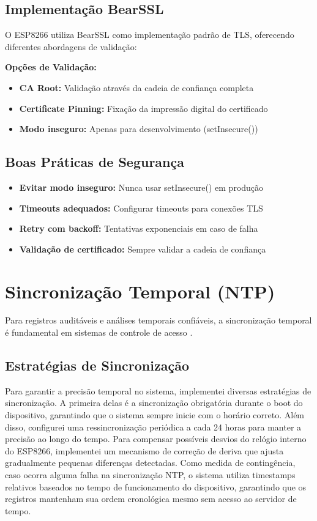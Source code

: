 \subsection{Implementação BearSSL}

O ESP8266 utiliza BearSSL como implementação padrão de TLS, oferecendo diferentes abordagens de validação:

\textbf{Opções de Validação:}
\begin{itemize}
\item \textbf{CA Root:} Validação através da cadeia de confiança completa
\item \textbf{Certificate Pinning:} Fixação da impressão digital do certificado
\item \textbf{Modo inseguro:} Apenas para desenvolvimento (setInsecure())
\end{itemize}

\subsection{Boas Práticas de Segurança}

\begin{itemize}
\item \textbf{Evitar modo inseguro:} Nunca usar setInsecure() em produção
\item \textbf{Timeouts adequados:} Configurar timeouts para conexões TLS
\item \textbf{Retry com backoff:} Tentativas exponenciais em caso de falha
\item \textbf{Validação de certificado:} Sempre validar a cadeia de confiança
\end{itemize}

\section{Sincronização Temporal (NTP)}
\label{sec:ntp-sync}

Para registros auditáveis e análises temporais confiáveis, a sincronização temporal é fundamental em sistemas de controle de acesso \cite{nic-br-ntp,observatorio-nacional}.

\subsection{Estratégias de Sincronização}

Para garantir a precisão temporal no sistema, implementei diversas estratégias de sincronização. A primeira delas é a sincronização obrigatória durante o boot do dispositivo, garantindo que o sistema sempre inicie com o horário correto. Além disso, configurei uma ressincronização periódica a cada 24 horas para manter a precisão ao longo do tempo. Para compensar possíveis desvios do relógio interno do ESP8266, implementei um mecanismo de correção de deriva que ajusta gradualmente pequenas diferenças detectadas. Como medida de contingência, caso ocorra alguma falha na sincronização NTP, o sistema utiliza timestamps relativos baseados no tempo de funcionamento do dispositivo, garantindo que os registros mantenham sua ordem cronológica mesmo sem acesso ao servidor de tempo.

